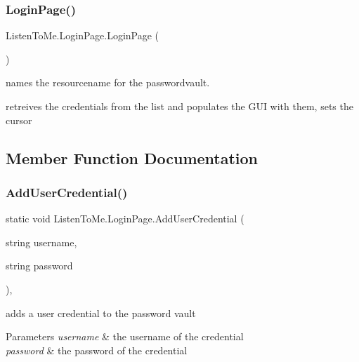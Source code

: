 \subsubsection{\texorpdfstring{Login\+Page()}{LoginPage()}}
{\footnotesize\ttfamily Listen\+To\+Me.\+Login\+Page.\+Login\+Page (\begin{DoxyParamCaption}{ }\end{DoxyParamCaption})}



names the resourcename for the passwordvault. 

retreives the credentials from the list and populates the G\+UI with them, sets the cursor 

\subsection{Member Function Documentation}
\mbox{\label{class_listen_to_me_1_1_login_page_af6692799b00ea2ad405a7af8dff73ad3}} 
\subsubsection{\texorpdfstring{Add\+User\+Credential()}{AddUserCredential()}}
{\footnotesize\ttfamily static void Listen\+To\+Me.\+Login\+Page.\+Add\+User\+Credential (\begin{DoxyParamCaption}\item[{string}]{username,  }\item[{string}]{password }\end{DoxyParamCaption})\hspace{0.3cm}{\ttfamily [static]}, {\ttfamily [private]}}



adds a user credential to the password vault 


\begin{DoxyParams}{Parameters}
{\em username} & the username of the credential\\
\hline
{\em password} & the password of the credential\\
\hline
\end{DoxyParams}
\mbox{\label{class_listen_to_me_1_1_login_page_ace57aa2c75a95bab9c32ea95bc9adb31}} 

